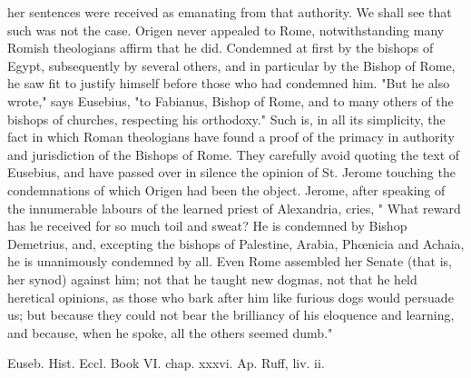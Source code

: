 her sentences were received as emanating from that authority. We shall see that such was not the case. Origen never appealed to Rome, notwithstanding many Romish theologians affirm that he did. Condemned at first by the bishops of Egypt, subsequently by several others, and in particular by the Bishop of Rome, he saw fit to justify himself before those who had condemned him. "But he also wrote," says Eusebius, "to Fabianus, Bishop of Rome, and to many others of the bishops of churches, respecting his orthodoxy." Such is, in all its simplicity, the fact in which Roman theologians have found a proof of the primacy in authority and jurisdiction of the Bishops of Rome. They carefully avoid quoting the text of Eusebius, and have passed over in silence the opinion of St. Jerome touching the condemnations of which Origen had been the object. Jerome, after speaking of the innumerable labours of the learned priest of Alexandria, cries, " What reward has he received for so much toil and sweat? He is condemned by Bishop Demetrius, and, excepting the bishops of Palestine, Arabia, Phœnicia and Achaia, he is unanimously condemned by all. Even Rome assembled her Senate (that is, her synod) against him; not that he taught new dogmas, not that he held heretical opinions, as those who bark after him like furious dogs would persuade us; but because they could not bear the brilliancy of his eloquence and learning, and because, when he spoke, all the others seemed dumb."

Euseb. Hist. Eccl. Book VI. chap. xxxvi. Ap. Ruff, liv. ii.

